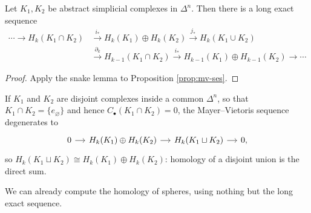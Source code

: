 \documentclass[a4paper]{scrartcl}
\begin{document}
\begin{theorem} \label{thm:mv}
	Let $K_1, K_2$ be abstract simplicial complexes in $\Delta^n$. Then there is a long exact sequence
	\begin{align*}
		\cdots \to H_k(K_1\cap K_2) &\xrightarrow{\ i_*\ } H_k(K_1)\oplus H_k(K_2) \xrightarrow{\ j_*\ } H_k(K_1\cup K_2) \\
		&\xrightarrow{\ \partial_k\ } H_{k-1}(K_1\cap K_2) \xrightarrow{\ i_*\ } H_{k-1}(K_1)\oplus H_{k-1}(K_2) \to \cdots
	\end{align*}
\end{theorem}
\begin{proof}
	Apply the snake lemma to Proposition \ref{prop:mv-ses}.
\end{proof}

\begin{example} \label{ex:disjoint}
	If $K_1$ and $K_2$ are disjoint complexes inside a common $\Delta^n$, so that $K_1 \cap K_2 = \{e_\varnothing\}$ and hence $C_\bullet(K_1\cap K_2) = 0$, the Mayer--Vietoris sequence degenerates to
	\[\begin{tikzcd}[column sep=small]
		0 \arrow[r] & {H_k(K_1)\oplus H_k(K_2)} \arrow[r] & {H_k(K_1\sqcup K_2)} \arrow[r] & 0,
	\end{tikzcd}\]
	so $H_k(K_1\sqcup K_2) \cong H_k(K_1)\oplus H_k(K_2)$: homology of a disjoint union is the direct sum.
\end{example}

We can already compute the homology of spheres, using nothing but the long exact
sequence.
\end{document}
